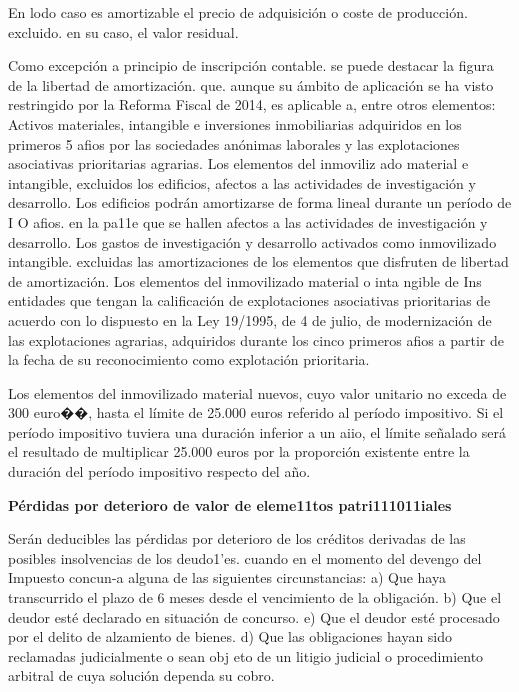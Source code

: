 \documentclass[10pt,a4paper]{article}
\begin{document}
En lodo caso es amortizable el precio de adquisición o coste de producción. excluido. en su caso, el valor residual.

Como excepción a principio de inscripción contable. se puede destacar la figura de la libertad de amortización. que. aunque su ámbito de aplicación se ha visto restringido por la Reforma Fiscal de 2014, es aplicable a, entre otros elementos: 
Activos materiales, intangible e inversiones inmobiliarias adquiridos en los primeros 5 afios por las sociedades anónimas laborales y las explotaciones asociativas prioritarias agrarias. Los elementos del inmoviliz ado material e intangible, excluidos los edificios, afectos a las actividades de investigación y desarrollo. Los edificios podrán amortizarse de forma lineal durante un período de I O afios. en la pa11e que se hallen afectos a las actividades de investigación y desarrollo. Los gastos de investigación y desarrollo activados como inmovilizado intangible. excluidas las amortizaciones de los elementos que disfruten de libertad de amortización. Los elementos del inmovilizado material o inta ngible de Ins entidades que tengan la calificación de explotaciones asociativas prioritarias de acuerdo con lo dispuesto en la Ley 19/1995, de 4 de julio, de modernización de las explotaciones agrarias, adquiridos durante los cinco primeros afios a partir de la fecha de su reconocimiento como explotación prioritaria.

Los elementos del inmovilizado material nuevos, cuyo valor unitario no exceda de 300 euro��, hasta el límite de 25.000 euros referido al período impositivo. Si el período impositivo tuviera una duración inferior a un aiio, el límite señalado será el resultado de multiplicar 25.000 euros por la proporción existente entre la duración del período impositivo respecto del año.

\textbf{Pérdidas por deterioro de valor de eleme11tos patri111011iales}

Serán deducibles las pérdidas por deterioro de los créditos derivadas de las posibles insolvencias de los deudo1'es. cuando en el momento del devengo del Impuesto concun-a alguna de las siguientes circunstancias:
a) Que haya transcurrido el plazo de 6 meses desde el vencimiento de la obligación.
b) Que el deudor esté declarado en situación de concurso.
e) Que el deudor esté procesado por el delito de alzamiento de bienes.
d) Que las obligaciones hayan sido reclamadas judicialmente o sean obj eto de un litigio judicial o procedimiento arbitral de cuya solución dependa su cobro.
\end{document}
